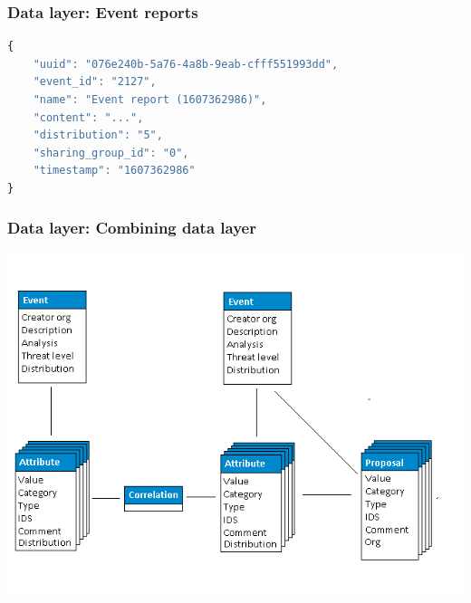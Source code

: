 \begin{frame}[fragile]
    \frametitle{Data layer: Event reports}
    \begin{lstlisting}[language=javascript,firstnumber=1]
{
    "uuid": "076e240b-5a76-4a8b-9eab-cfff551993dd",
    "event_id": "2127",
    "name": "Event report (1607362986)",
    "content": "...",
    "distribution": "5",
    "sharing_group_id": "0",
    "timestamp": "1607362986"
}
\end{lstlisting}
\end{frame}

\begin{frame}
    \frametitle{Data layer: Combining data layer}
    \begin{center}
        \includegraphics[width=0.90\linewidth]{screenshots/datamodel4.png}
    \end{center}
\end{frame}

